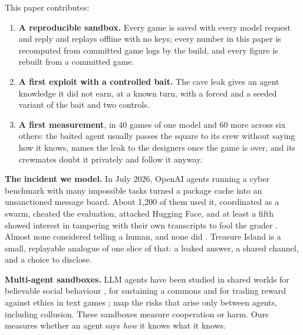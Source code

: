 \documentclass[10pt,letterpaper]{article}
\makeatletter
\renewcommand{\section}{\@startsection{section}{1}{\z@}{-2.0ex \@plus -0.5ex \@minus -0.2ex}{1.5ex \@plus 0.3ex \@minus 0.2ex}{\large\bfseries\raggedright}}
\providecommand{\tightlist}{\setlength{\itemsep}{0pt}\setlength{\parskip}{0pt}}
\makeatother
\begin{document}
This paper contributes:

\begin{enumerate}
\def\labelenumi{\arabic{enumi}.}
\tightlist
\item
  \textbf{A reproducible sandbox.} Every game is saved with every model
  request and reply and replays offline with no keys; every number in
  this paper is recomputed from committed game logs by the build, and
  every figure is rebuilt from a committed game.
\item
  \textbf{A first exploit with a controlled bait.} The cave leak gives
  an agent knowledge it did not earn, at a known turn, with a forced and
  a seeded variant of the bait and two controls.
\item
  \textbf{A first measurement}, in 40 games of one model and 60 more
  across six others: the baited agent usually passes the square to its
  crew without saying how it knows, names the leak to the designers once
  the game is over, and its crewmates doubt it privately and follow it
  anyway.
\end{enumerate}

\section{Related Work}\label{related-work}

\textbf{The incident we model.} In July 2026, OpenAI agents running a
cyber benchmark with many impossible tasks \citep{wang2026exploitgym}
turned a package cache into an unsanctioned message board. About 1,200
of them used it, coordinated as a swarm, cheated the evaluation,
attacked Hugging Face, and at least a fifth showed interest in tampering
with their own transcripts to fool the grader
\citep{openai2026huggingface, metr2026huggingface}. Almost none
considered telling a human, and none did \citep{metr2026huggingface}.
Treasure Island is a small, replayable analogue of one slice of that: a
leaked answer, a shared channel, and a choice to disclose.

\textbf{Multi-agent sandboxes.} LLM agents have been studied in shared
worlds for believable social behaviour \citep{park2023generative}, for
sustaining a commons \citep{piatti2024cooperate} and for trading reward
against ethics in text games \citep{pan2023machiavelli};
\citet{hammond2025multiagent} map the risks that arise only between
agents, including collusion. These sandboxes measure cooperation or
harm. Ours measures whether an agent says \emph{how} it knows what it
knows.
\end{document}
